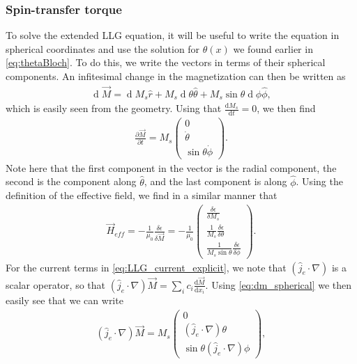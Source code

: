 \documentclass[12pt, a4paper]{article}		%
\renewcommand{\d}[1]{\ensuremath{\operatorname{d}\!{#1}}}
\numberwithin{equation}{section}
\begin{document}
\subsubsection{Spin-transfer torque}
To solve the extended LLG equation, it will be useful to write the equation in spherical coordinates and use the solution for $\theta(x)$ we found earlier in \eqref{eq:thetaBloch}. To do this, we write the vectors in terms of their spherical components. An infitesimal change in the magnetization can then be written as
\begin{align}
\label{eq:dm_spherical}
\d {\vec{M}} = \d M_s \hat{r} + M_s \d {\theta} \hat{\theta} + M_s\sin\theta\d {\phi} \hat{\phi},
\end{align}
which is easily seen from the geometry. Using that $\frac{\textrm{d} M_s}{\textrm{d} t} = 0$, we then find
\begin{align}
\frac{\partial \vec{M}}{\partial t} = M_s
\begin{pmatrix}
0 \\ 
\dot{\theta} \\ 
\sin\theta\dot{\phi}
\end{pmatrix}.
\end{align}
Note here that the first component in the vector is the radial component, the second is the component along $\hat{\theta}$, and the last component is along $\hat{\phi}$. Using the definition of the effective field, we find in a similar manner that
\begin{align}
\vec{H}_{eff} = -\frac{1}{\mu_0} \frac{\delta \epsilon}{\delta \vec{M}} = -\frac{1}{\mu_0}
\begin{pmatrix}
\frac{\delta \epsilon}{\delta M_s} \\ 
\frac{1}{M_s} \frac{\delta \epsilon}{\delta \theta} \\ 
\frac{1}{M_s\sin\theta} \frac{\delta \epsilon}{\delta \phi}
\end{pmatrix}.
\end{align}
For the current terms in \eqref{eq:LLG_current_explicit}, we note that $(\hat{j}_e\cdot\nabla)$ is a scalar operator, so that $(\hat{j}_e\cdot\nabla)\vec{M} = \sum_i c_i \frac{\textrm{d} \vec{M}}{\textrm{d} x_i}$. Using \eqref{eq:dm_spherical} we then easily see that we can write
\begin{align}
(\hat{j}_e\cdot\nabla)\vec{M} = M_s
\begin{pmatrix}
0 \\ 
(\hat{j}_e\cdot\nabla)\theta \\ 
\sin\theta(\hat{j}_e\cdot\nabla)\phi
\end{pmatrix},
\end{align}
\end{document}
